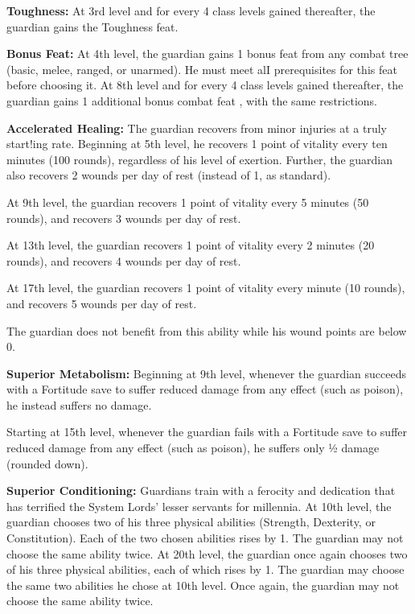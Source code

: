 \textbf{Toughness:} At 3rd level and for every 4 class levels gained thereafter, the guardian gains the Toughness feat.

\textbf{Bonus Feat:} At 4th level, the guardian gains 1 bonus feat from any combat tree (basic, melee, ranged, or unarmed). He must meet alI prerequisites for this feat before choosing it.
At 8th level and for every 4 class levels gained thereafter, the guardian gains 1 additional bonus combat feat , with the same restrictions.

\textbf{Accelerated Healing:} The guardian recovers from minor injuries at a truly start!ing rate. Beginning at 5th level, he recovers 1 point of vitality every ten minutes (100 rounds), regardless of his level of exertion. Further, the guardian also recovers 2 wounds per day of rest (instead of 1, as standard).

At 9th level, the guardian recovers 1 point of vitality every 5 minutes (50 rounds), and recovers 3 wounds per day of rest.

At 13th level, the guardian recovers 1 point of vitality every 2 minutes (20 rounds), and recovers 4 wounds per day of rest.

At 17th level, the guardian recovers 1 point of vitality every minute (10 rounds), and recovers 5 wounds per day of rest.

The guardian does not benefit from this ability while his wound points are below 0.

\textbf{Superior Metabolism:} Beginning at 9th level, whenever the guardian succeeds with a Fortitude save to suffer reduced damage from any effect (such as poison), he instead suffers no damage.

Starting at 15th level, whenever the guardian fails with a Fortitude save to suffer reduced damage from any effect (such as poison), he suffers only ½ damage (rounded down).

\textbf{Superior Conditioning:} Guardians train with a ferocity and dedication that has terrified the System Lords' lesser servants for millennia. At 10th level, the guardian chooses two of his three physical abilities (Strength, Dexterity, or Constitution). Each of the two chosen abilities rises by 1. The guardian may not choose the same ability twice.
At 20th level, the guardian once again chooses two of his three physical abilities, each of which rises by 1. The guardian may choose the same two abilities he chose at 10th level. Once again, the guardian may not choose the same ability twice.

